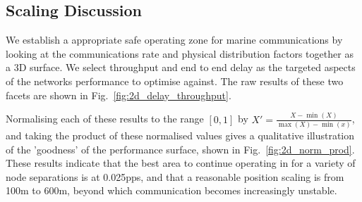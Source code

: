 \documentclass[runningheads,a4paper]{llncs}
\begin{document}
\subsection{Scaling Discussion}

We establish a appropriate safe operating zone for marine communications by looking at the communications rate and physical distribution factors together as a 3D surface.
We select throughput and end to end delay as the targeted aspects of the networks performance to optimise against.
The raw results of these two facets are shown in Fig.~\ref{fig:2d_delay_throughput}.

Normalising each of these results to the range $[0,1]$ by $X'=\frac{X-\min(X)}{\max(X)-\min(x)}$, and taking the product of these normalised values gives a qualitative illustration of the 'goodness' of the performance surface, shown in Fig.~\ref{fig:2d_norm_prod}. 
These results indicate that the best area to continue operating in for a variety of node separations is at 0.025pps, and that a reasonable position scaling is from 100m to 600m, beyond which communication becomes increasingly unstable.
\end{document}

